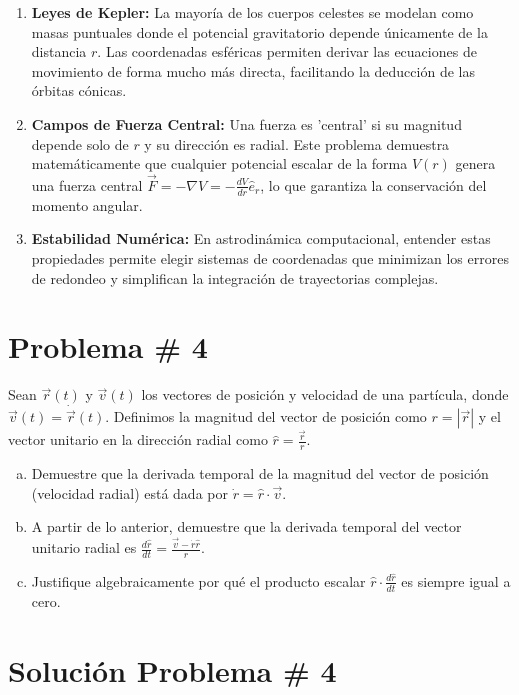 \documentclass[a4paper]{article}
\begin{document}
\begin{enumerate}
    \item \textbf{Leyes de Kepler:} La mayoría de los cuerpos celestes se modelan como masas puntuales donde el potencial gravitatorio depende únicamente de la distancia $r$. Las coordenadas esféricas permiten derivar las ecuaciones de movimiento de forma mucho más directa, facilitando la deducción de las órbitas cónicas.
    \item \textbf{Campos de Fuerza Central:} Una fuerza es 'central' si su magnitud depende solo de $r$ y su dirección es radial. Este problema demuestra matemáticamente que cualquier potencial escalar de la forma $V(r)$ genera una fuerza central $\vec{F} = -\nabla V = -\frac{dV}{dr} \hat{e}_r$, lo que garantiza la conservación del momento angular.
    \item \textbf{Estabilidad Numérica:} En astrodinámica computacional, entender estas propiedades permite elegir sistemas de coordenadas que minimizan los errores de redondeo y simplifican la integración de trayectorias complejas.
\end{enumerate}

\section{Problema \# 4}

Sean $\vec{r}(t)$ y $\vec{v}(t)$ los vectores de posición y velocidad de una partícula, donde $\vec{v}(t) = \dot{\vec{r}}(t)$. Definimos la magnitud del vector de posición como $r = |\vec{r}|$ y el vector unitario en la dirección radial como $\hat{r} = \frac{\vec{r}}{r}$.

\begin{enumerate}[a)]
    \item Demuestre que la derivada temporal de la magnitud del vector de posición (velocidad radial) está dada por $\dot{r} = \hat{r} \cdot \vec{v}$.
    \item A partir de lo anterior, demuestre que la derivada temporal del vector unitario radial es $\frac{d\hat{r}}{dt} = \frac{\vec{v} - \dot{r}\hat{r}}{r}$.
    \item Justifique algebraicamente por qué el producto escalar $\hat{r} \cdot \frac{d\hat{r}}{dt}$ es siempre igual a cero.
\end{enumerate}

\section*{Solución Problema \# 4}
\end{document}
